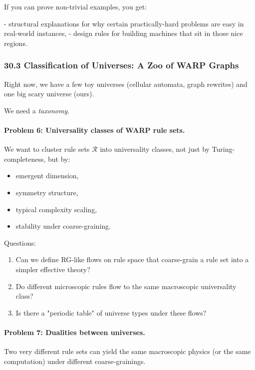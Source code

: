 If you can prove non-trivial examples, you get:

- structural explanations for why certain practically-hard problems are easy in real-world instances,
- design rules for building machines that sit in those nice regions.

\subsubsection*{30.3  Classification of Universes: A Zoo of WARP Graphs}

Right now, we have a few toy universes (cellular automata, graph rewrites) and one big scary universe (ours).

We need a \emph{taxonomy}.

\paragraph{Problem 6: Universality classes of WARP rule sets.}

We want to cluster rule sets $\mathcal{R}$ into universality classes, not just by Turing-completeness, but by:

\begin{itemize}
  \item emergent dimension,
  \item symmetry structure,
  \item typical complexity scaling,
  \item stability under coarse-graining.
\end{itemize}

Questions:

\begin{enumerate}
  \item Can we define RG-like flows on rule space that coarse-grain a rule set into a simpler effective theory?
  \item Do different microscopic rules flow to the same macroscopic universality class?
  \item Is there a "periodic table" of universe types under these flows?
\end{enumerate}

\paragraph{Problem 7: Dualities between universes.}

Two very different rule sets can yield the same macroscopic physics (or the same computation) under different coarse-grainings.

